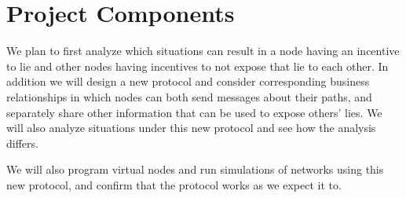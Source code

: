 \documentclass[12pt]{article}
\begin{document}
  \section{Project Components}
  We plan to first analyze which situations can result in a node having an incentive to lie and other nodes having incentives to not expose that lie to each other. In addition we will design a new protocol and consider corresponding business relationships in which nodes can both send messages about their paths, and separately share other information that can be used to expose others' lies. We will also analyze situations under this new protocol and see how the analysis differs.
  
  We will also program virtual nodes and run simulations of networks using this new protocol, and confirm that the protocol works as we expect it to.




{}

\end{document}
